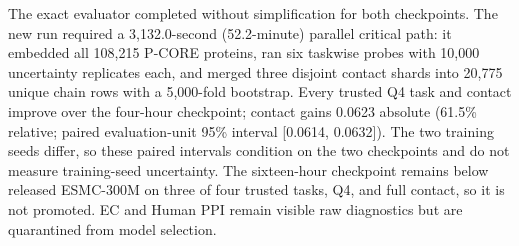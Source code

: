 \documentclass{article}
\begin{document}
\begin{table}[H]
  \centering
  \scriptsize
  \setlength{\tabcolsep}{3.5pt}
  \caption{Completed ESMC-300M Stage-1 runs. Throughput uses accumulated step-compute time; optimizer-step completion is authoritative.}
  \label{tab:current}
\end{table}

The exact evaluator completed without simplification for both checkpoints. The
new run required a 3,132.0-second (52.2-minute) parallel critical path: it
embedded all 108,215 P-CORE proteins, ran six taskwise probes with 10,000
uncertainty replicates each, and merged three disjoint contact shards into
20,775 unique chain rows with a 5,000-fold bootstrap. Every trusted Q4 task and
contact improve over the four-hour checkpoint; contact gains 0.0623 absolute
(61.5\% relative; paired evaluation-unit 95\% interval [0.0614, 0.0632]). The
two training seeds differ, so these paired intervals condition on the two
checkpoints and do not measure training-seed uncertainty. The sixteen-hour
checkpoint remains below released ESMC-300M on three of four trusted tasks,
Q4, and full contact, so it is not promoted. EC and Human PPI remain visible
raw diagnostics but are quarantined from model selection.
\end{document}
